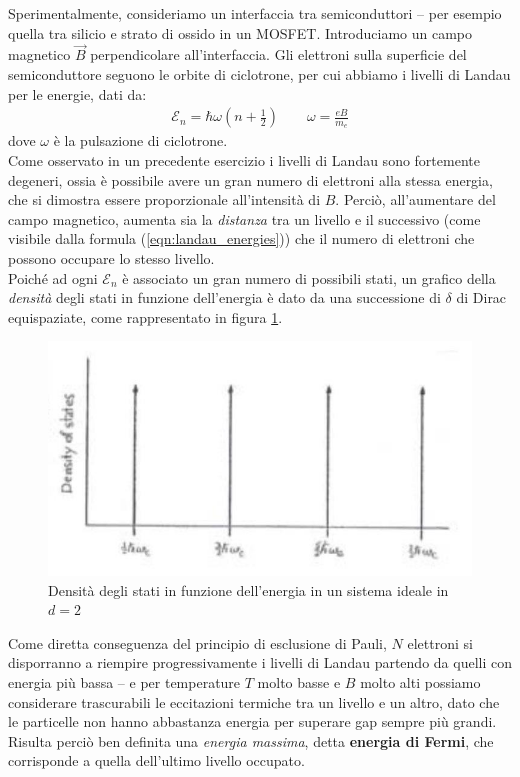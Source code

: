 \documentclass[../../FisicaTeorica.tex]{subfiles}
\begin{document}
Sperimentalmente, consideriamo un interfaccia tra semiconduttori -- per esempio quella tra silicio e strato di ossido in un MOSFET. Introduciamo un campo magnetico $\vec{B}$ perpendicolare all'interfaccia. Gli elettroni sulla superficie del semiconduttore seguono le orbite di ciclotrone, per cui abbiamo i livelli di Landau per le energie, dati da:
\begin{align}
\mathcal{E}_n=\hbar \omega \left(n+\frac{1}{2}\right)\qquad \omega = \frac{eB}{m_e}
\label{eqn:landau_energies}
\end{align}
dove $\omega$ è la pulsazione di ciclotrone.\\
Come osservato in un precedente esercizio %
i livelli di Landau sono fortemente degeneri, ossia è possibile avere un gran numero di elettroni alla stessa energia, che si dimostra essere proporzionale all'intensità di $B$. Perciò, all'aumentare del campo magnetico, aumenta sia la \textit{distanza} tra un livello e il successivo (come visibile dalla formula (\ref{eqn:landau_energies})) che il numero di elettroni che possono occupare lo stesso livello.\\
Poiché ad ogni $\mathcal{E}_n$ è associato un gran numero di possibili stati, un grafico della \textit{densità} degli stati in funzione dell'energia è dato da una successione di $\delta$ di Dirac equispaziate, come rappresentato in figura \ref{fig:Landau_ideale}.
\begin{figure}[H]
\centering
\includegraphics[scale=0.5]{Immagini/12_12/image013.jpg}
\caption{Densità degli stati in funzione dell'energia in un sistema ideale in $d=2$\label{fig:Landau_ideale}}
\end{figure}
Come diretta conseguenza del principio di esclusione di Pauli, $N$ elettroni si disporranno a riempire progressivamente i livelli di Landau partendo da quelli con energia più bassa -- e per temperature $T$ molto basse e $B$ molto alti possiamo considerare trascurabili le eccitazioni termiche tra un livello e un altro, dato che le particelle non hanno abbastanza energia per superare gap sempre più grandi. Risulta perciò ben definita una \textit{energia massima}, detta \textbf{energia di Fermi}, che corrisponde a quella dell'ultimo livello occupato.\\
\end{document}

